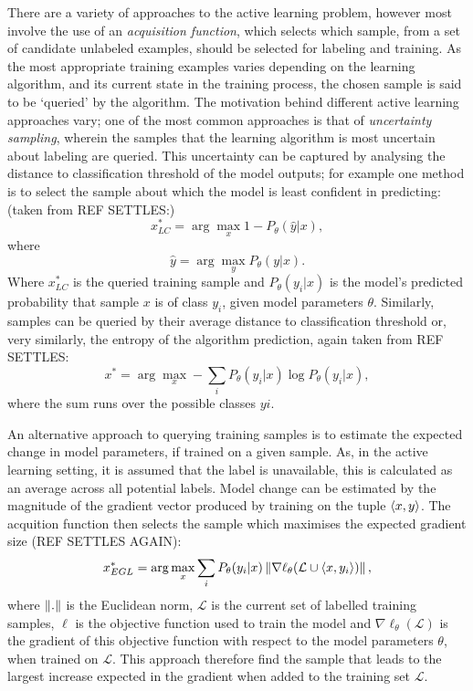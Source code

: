 There are a variety of approaches to the active learning problem, however most involve the use of an \textit{acquisition function}, which selects which sample, from a set of candidate unlabeled examples, should be selected for labeling and training. As the most appropriate training examples varies depending on the learning algorithm, and its current state in the training process, the chosen sample is said to be `queried' by the algorithm. The motivation behind different active learning approaches vary; one of the most common approaches is that of \textit{uncertainty sampling}, wherein the samples that the learning algorithm is most uncertain about labeling are queried. This uncertainty can be captured by analysing the distance to classification threshold of the model outputs; for example one method is to select the sample about which the model is least confident in predicting: (taken from REF SETTLES:)
\begin{equation}
x^{*}_{LC} = \arg\max_{x} 1 - P_{\theta}(\hat{y}|x),
\end{equation}
where
\begin{equation}
\hat{y} = \arg\max_{y}P_{\theta}(y|x).
\end{equation}
Where $x^{*}_{LC}$ is the queried training sample and $P_{\theta}(y_{i}|x)$ is the model's predicted probability that sample $x$ is of class $y_{i}$, given model parameters $\theta$. Similarly, samples can be queried by their average distance to classification threshold or, very similarly, the entropy of the algorithm prediction, again taken from REF SETTLES:
\begin{equation}
x^{*} = \arg\max_{x} - \sum_{i} P_{\theta}(y_i|x)\log P_{\theta}(y_i|x),
\end{equation}
where the sum runs over the possible classes $yi$.

An alternative approach to querying training samples is to estimate the expected change in model parameters, if trained on a given sample. As, in the active learning setting, it is assumed that the label is unavailable, this is calculated as an average across all potential labels. Model change can be estimated by the magnitude of the gradient vector produced by training on the tuple $\braket{x,y}$. The acquition function then selects the sample which maximises the expected gradient size (REF SETTLES AGAIN):
\begin{equation}
x^{*}_{EGL} = \arg\max_{x} \sum_{i} P_{\theta}(y_i|x) \left\lVert\nabla \ell_{\theta}(\mathcal{L} \cup \braket{x,y_{i}})\right\rVert,
\end{equation}
where $\left\lVert.\right\rVert$ is the Euclidean norm, $\mathcal{L}$ is the current set of labelled training samples, $\ell$ is the objective function used to train the model and $\nabla \ell_{\theta}(\mathcal{L})$ is the gradient of this objective function with respect to the model parameters $\theta$, when trained on $\mathcal{L}$. This approach therefore find the sample that leads to the largest increase expected in the gradient when added to the training set $\mathcal{L}$.

